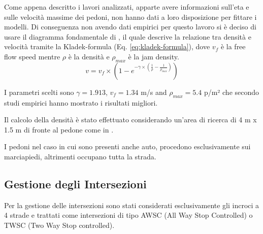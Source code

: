 



Come appena descritto i lavori analizzati, apparte avere informazioni sull'eta e sulle velocità massime dei pedoni, non hanno dati a loro disposizione per fittare i modelli.
Di conseguenza non avendo dati empirici per questo lavoro si è deciso di usare il diagramma fondamentale di \textcite{weidmann1993transporttechnik},
il quale descrive la relazione tra densità e velocità tramite la Kladek-formula (Eq. \ref{eq:kladek-formula}),
dove $v_{f}$ è la free flow speed mentre $\rho$ è la densità e $\rho_{max}$ è la jam density.
%
\begin{equation}
    v = v_{f} \times (1 - e^{-\gamma \times (\frac{1}{\rho} - \frac{1}{\rho_{max}})})
    \label{eq:kladek-formula}
\end{equation}

I parametri scelti sono $\gamma = 1.913$, $v_f = 1.34$ m/s and $\rho_{max} = 5.4$ p/m² che secondo studi empirici hanno mostrato i risultati migliori.

Il calcolo della densità è stato effettuato considerando un'area di ricerca di 4 m x 1.5 m di fronte al pedone
come in \textcite{goto2012tsunami, wang2021novel}.

I pedoni nel caso in cui sono presenti anche auto, procedono esclusivamente sui marciapiedi, altrimenti occupano tutta la strada.


\newpage

\subsection{Gestione degli Intersezioni}
Per la gestione delle intersezioni sono stati considerati esclusivamente gli incroci a 4 strade e trattati come intersezioni di tipo AWSC (All Way Stop Controlled) o TWSC (Two Way Stop controlled).

